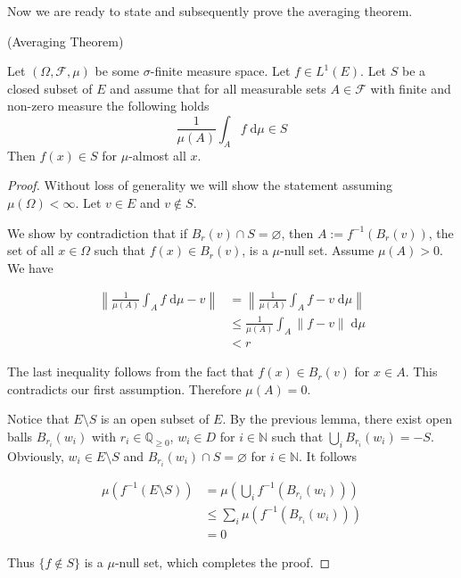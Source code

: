 Now we are ready to state and subsequently prove the averaging theorem.

\begin{theorem} (Averaging Theorem) \par
Let $(\Omega, \mathcal{F}, \mu)$ be some $\sigma$-finite measure space. Let $f \in L^1(E)$. Let $S$ be a closed subset of $E$ and assume that for all measurable sets $A \in \mathcal{F}$ with finite and non-zero measure the following holds
\[
	\frac{1}{\mu(A)}\int_A f \;\textrm{d}\mu \in S
\]
Then $f(x) \in S$ for $\mu$-almost all $x$.
\end{theorem}
\begin{proof}
Without loss of generality we will show the statement assuming $\mu(\Omega) < \infty$. Let $v \in E$ and $v \notin S$. 

We show by contradiction that if $B_r(v) \cap S = \varnothing$,  then $A := f^{-1}(B_r(v))$, the set of all $x \in \Omega$ such that $f(x) \in B_r(v)$, is a $\mu$-null set. Assume $\mu(A) > 0$. We have

\begin{align*}
	\left\lVert \frac{1}{\mu(A)}\int_A f \;\textrm{d}\mu  - v \right\rVert &= \left\lVert \frac{1}{\mu(A)}\int_A f - v \;\textrm{d}\mu \right\rVert \\
	&\le \frac{1}{\mu(A)}\int_A \lVert f - v \rVert \;\textrm{d}\mu \\
	&< r
\end{align*}

The last inequality follows from the fact that $f(x) \in B_r(v)$ for $x \in A$. This contradicts our first assumption. Therefore $\mu(A) = 0$.

Notice that $E \setminus S$ is an open subset of $E$. By the previous lemma, there exist open balls $B_{r_i}(w_i)$ with $r_i \in \mathbb{Q}_{\ge 0}$, $w_i \in D$ for $i \in \mathbb{N}$ such that $\bigcup_i B_{r_i}(w_i) = - S$. Obviously, $w_i \in E \setminus S$ and $B_{r_i}(w_i) \cap S = \varnothing$ for $i \in \mathbb{N}$. It follows

\begin{align*}
	\mu(f^{-1}(E \setminus S)) &= \mu\left(\bigcup_i f^{-1}(B_{r_i}(w_i))\right) \\
	&\le \sum_i \mu(f^{-1}(B_{r_i}(w_i))) \\
	&= 0
\end{align*}

Thus $\{f \notin S \}$ is a $\mu$-null set, which completes the proof.

\end{proof}

